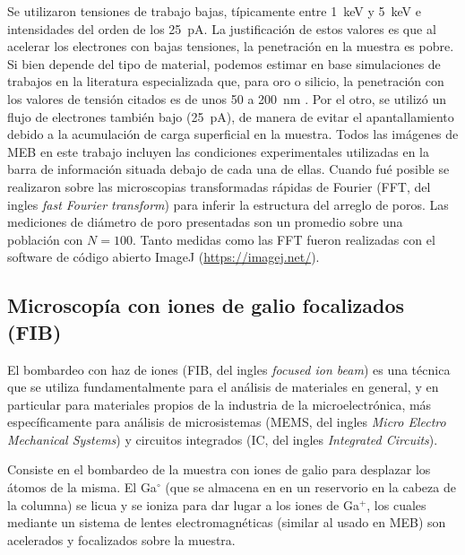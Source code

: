 		Se utilizaron tensiones de trabajo bajas, típicamente entre \SI{1}{\kilo\electronvolt} y \SI{5}{\kilo\electronvolt} e intensidades del orden de los \SI{25}{\pA}. La justificación de estos valores es que al acelerar los electrones con bajas tensiones, la penetración en la muestra es pobre. Si bien depende del tipo de material, podemos estimar en base simulaciones de trabajos en la literatura especializada que, para oro o silicio, la penetración con los valores de tensión citados es de unos 50 a \SI{200}{\nm} \cite{Joy1984,Shur2012,Hafner2007}. Por el otro, se utilizó un flujo de electrones también bajo (\SI{25}{\pA}), de manera de evitar el apantallamiento debido a la acumulación de carga superficial en la muestra. Todos las imágenes de MEB en este trabajo incluyen las condiciones experimentales utilizadas en la barra de información situada debajo de cada una de ellas. Cuando fué posible se realizaron sobre las microscopias transformadas rápidas de Fourier (FFT, del ingles \textit{fast Fourier transform}) para inferir la estructura del arreglo de poros. Las mediciones de diámetro de poro presentadas son un promedio sobre una población con $N=100$. Tanto  medidas como las FFT fueron realizadas con el software de código abierto ImageJ (\url{https://imagej.net/})\cite{ImageJ2012}.	

					
	\subsection{Microscopía con iones de galio focalizados (FIB)}\label{sec:FIB}

		El bombardeo con haz de iones (FIB, del ingles \textit{focused ion beam}) es una técnica que se utiliza fundamentalmente para el análisis de materiales en general, y en particular para materiales propios de la industria de la microelectrónica, más específicamente para análisis de microsistemas (MEMS, del ingles \textit{Micro Electro Mechanical Systems}) y circuitos integrados (IC, del ingles \textit{Integrated Circuits}). 

		Consiste en el bombardeo de la muestra con iones de galio para desplazar los átomos de la misma. El Ga$^{\circ}$ (que se almacena en en un 
		reservorio en la cabeza de la columna) se licua y se ioniza para dar lugar a los iones de Ga${^+}$, los cuales mediante un sistema de lentes electromagnéticas (similar al usado en MEB) son acelerados y focalizados sobre la muestra. 

